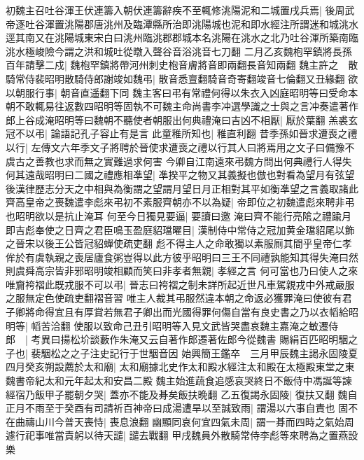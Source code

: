 初魏主召吐谷渾王伏連籌入朝伏連籌辭疾不至輒修洮陽泥和二城置戌兵焉|{
	後周武帝逐吐谷渾置洮陽郡唐洮州及臨潭縣所治即洮陽城也泥和即水經注所謂迷和城洮水逕其南又在洮陽城東宋白曰洮州臨洮郡郡城本名洮陽在洮水之北乃吐谷渾所築南臨洮水極峻險今謂之洪和城吐從暾入聲谷音浴洮音七刀翻}
二月乙亥魏枹罕鎮將長孫百年請擊二戍|{
	魏枹罕鎮將帶河州刺史枹音膚將音即兩翻長音知兩翻}
魏主許之　散騎常侍裴昭明散騎侍郎謝竣如魏弔|{
	散音悉亶翻騎音奇寄翻竣音七倫翻又丑緣翻}
欲以朝服行事|{
	朝音直遥翻下同}
魏主客曰弔有常禮何得以朱衣入凶庭昭明等曰受命本朝不敢輒易往返數四昭明等固執不可魏主命尚書李冲選學識之士與之言冲奏遣著作郎上谷成淹昭明等曰魏朝不聽使者朝服出何典禮淹曰吉凶不相厭|{
	厭於葉翻}
羔裘玄冠不以弔|{
	論語記孔子容止有是言}
此童稚所知也|{
	稚直利翻}
昔季孫如晉求遭喪之禮以行|{
	左傳文六年季文子將聘於晉使求遭喪之禮以行其人曰將焉用之文子曰備豫不虞古之善教也求而無之實難過求何害}
今卿自江南遠來弔魏方問出何典禮行人得失何其遠哉昭明曰二國之禮應相凖望|{
	凖揆平之物又其義擬也倣也對看為望月有弦望後漢律歷志分天之中相與為衡謂之望謂月望日月正相對其平如衡凖望之言義取諸此}
齊高皇帝之喪魏遣李彪來弔初不素服齊朝亦不以為疑|{
	帝即位之初魏遣彪來聘非弔也昭明欲以是抗止淹耳}
何至今日獨見要逼|{
	要讀曰邀}
淹曰齊不能行亮隂之禮踰月即吉彪奉使之日齊之君臣鳴玉盈庭貂璫曜目|{
	漢制侍中常侍之冠加黄金璫貂尾以飾之晉宋以後王公皆冠貂蟬使疏吏翻}
彪不得主人之命敢獨以素服厠其間乎皇帝仁孝侔於有虞執親之喪居廬食粥豈得以此方彼乎昭明曰三王不同禮孰能知其得失淹曰然則虞舜高宗皆非邪昭明竣相顧而笑曰非孝者無親|{
	孝經之言}
何可當也乃曰使人之來唯齎袴褶此既戎服不可以弔|{
	晉志曰袴褶之制未詳所起近世凡車駕親戎中外戒嚴服之服無定色使疏吏翻褶音習}
唯主人裁其弔服然違本朝之命返必獲罪淹曰使彼有君子卿將命得宜且有厚賞若無君子卿出而光國得罪何傷自當有良史書之乃以衣幍給昭明等|{
	幍苦洽翻}
使服以致命己丑引昭明等入見文武皆哭盡哀魏主嘉淹之敏遷侍郎　|{
	考異曰揚松圿談藪作朱淹又云自著作郎遷著佐郎今從魏書}
賜絹百匹昭明駰之子也|{
	裴駰松之之子注史記行于世駰音因}
始興簡王鑑卒　三月甲辰魏主謁永固陵夏四月癸亥朔設薦於太和廟|{
	太和廟據北史作太和殿水經注太和殿在太極殿東堂之東魏書帝紀太和元年起太和安昌二殿}
魏主始進蔬食追感哀哭終日不飯侍中馮誕等諫經宿乃飯甲子罷朝夕哭|{
	蓋亦不能及朞矣飯扶晩翻}
乙五復謁永固陵|{
	復扶又翻}
魏自正月不雨至于癸酉有司請祈百神帝曰成湯遭旱以至誠致雨|{
	謂湯以六事自責也}
固不在曲禱山川今普天喪恃|{
	喪息浪翻}
幽顯同哀何宜四氣未周|{
	謂一朞而四時之氣始周}
遽行祀事唯當責躬以待天譴|{
	譴去戰翻}
甲戌魏員外散騎常侍李彪等來聘為之置燕設樂

